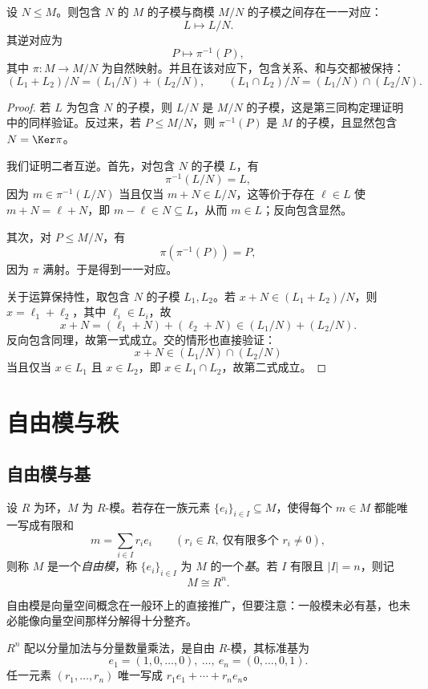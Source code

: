 \begin{theorem}[对应定理]
设 $N\le M$。则包含 $N$ 的 $M$ 的子模与商模 $M/N$ 的子模之间存在一一对应：
\[
L\longmapsto L/N.
\]
其逆对应为
\[
P\longmapsto \pi^{-1}(P),
\]
其中 $\pi\colon M\to M/N$ 为自然映射。并且在该对应下，包含关系、和与交都被保持：
\[
(L_1+L_2)/N=(L_1/N)+(L_2/N),\qquad (L_1\cap L_2)/N=(L_1/N)\cap (L_2/N).
\]
\end{theorem}

\begin{proof}
若 $L$ 为包含 $N$ 的子模，则 $L/N$ 是 $M/N$ 的子模，这是第三同构定理证明中的同样验证。反过来，若 $P\le M/N$，则 $\pi^{-1}(P)$ 是 $M$ 的子模，且显然包含 $N=\Ker\pi$。

我们证明二者互逆。首先，对包含 $N$ 的子模 $L$，有
\[
\pi^{-1}(L/N)=L,
\]
因为 $m\in \pi^{-1}(L/N)$ 当且仅当 $m+N\in L/N$，这等价于存在 $\ell\in L$ 使 $m+N=\ell+N$，即 $m-\ell\in N\subseteq L$，从而 $m\in L$；反向包含显然。

其次，对 $P\le M/N$，有
\[
\pi(\pi^{-1}(P))=P,
\]
因为 $\pi$ 满射。于是得到一一对应。

关于运算保持性，取包含 $N$ 的子模 $L_1,L_2$。若 $x+N\in (L_1+L_2)/N$，则 $x=\ell_1+\ell_2$，其中 $\ell_i\in L_i$，故
\[
x+N=(\ell_1+N)+(\ell_2+N)\in (L_1/N)+(L_2/N).
\]
反向包含同理，故第一式成立。交的情形也直接验证：
\[
x+N\in (L_1/N)\cap(L_2/N)
\]
当且仅当 $x\in L_1$ 且 $x\in L_2$，即 $x\in L_1\cap L_2$，故第二式成立。
\end{proof}

\section{自由模与秩}

\subsection{自由模与基}

\begin{definition}
设 $R$ 为环，$M$ 为 $R$-模。若存在一族元素 $\{e_i\}_{i\in I}\subseteq M$，使得每个 $m\in M$ 都能唯一写成有限和
\[
m=\sum_{i\in I} r_ie_i\qquad (r_i\in R,\ \text{仅有限多个 }r_i\ne 0),
\]
则称 $M$ 是一个\emph{自由模}，称 $\{e_i\}_{i\in I}$ 为 $M$ 的一个\emph{基}。若 $I$ 有限且 $|I|=n$，则记
\[
M\cong R^n.
\]
\end{definition}

自由模是向量空间概念在一般环上的直接推广，但要注意：一般模未必有基，也未必能像向量空间那样分解得十分整齐。

\begin{example}
$R^n$ 配以分量加法与分量数量乘法，是自由 $R$-模，其标准基为
\[
e_1=(1,0,\dots,0),\ \dots,\ e_n=(0,\dots,0,1).
\]
任一元素 $(r_1,\dots,r_n)$ 唯一写成 $r_1e_1+\cdots+r_ne_n$。
\end{example}

